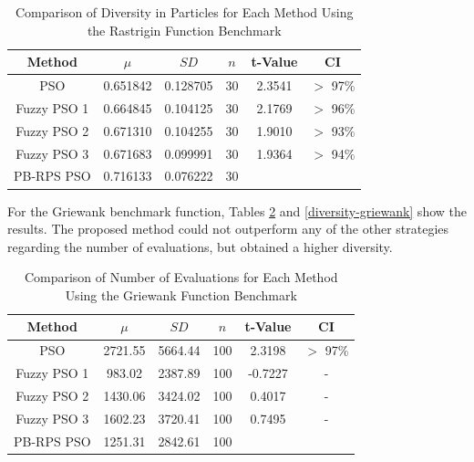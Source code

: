 \begin{table}[!t]
  \renewcommand{\arraystretch}{1.3}
  \caption{Comparison of Diversity in Particles for Each Method Using the Rastrigin Function Benchmark}
  \label{diversity-rastrigin}
  \centering
  \begin{tabular}{|c|c|c|c|c|c|}
    \hline
    Method & $\mu$ & $SD$ & $n$ & t-Value & CI \\
    \hline
    PSO 		& 0.651842 & 0.128705 & 30 & 2.3541 & $>$ 97\% \\
    \hline
    Fuzzy PSO 1 & 0.664845 & 0.104125 & 30 & 2.1769 & $>$ 96\% \\
    \hline
    Fuzzy PSO 2 & 0.671310 & 0.104255 & 30 & 1.9010 & $>$ 93\% \\
    \hline
    Fuzzy PSO 3 & 0.671683 & 0.099991 & 30 & 1.9364 & $>$ 94\% \\
    \hline
    PB-RPS PSO  & 0.716133 & 0.076222 & 30 &  &  \\
    \hline
  \end{tabular}
\end{table}

For the Griewank benchmark function, Tables \ref{evaluations-griewank} and \ref{diversity-griewank} show the results. The proposed method could not outperform any of the other strategies regarding the number of evaluations, but obtained a higher diversity.

\begin{table}[!t]
  \renewcommand{\arraystretch}{1.3}
  \caption{Comparison of Number of Evaluations for Each Method Using the Griewank Function Benchmark}
  \label{evaluations-griewank}
  \centering
  \begin{tabular}{|c|c|c|c|c|c|}
    \hline
    Method & $\mu$ & $SD$ & $n$ & t-Value & CI \\
    \hline
    PSO 		& 2721.55 & 5664.44 & 100 & 2.3198 & $>$ 97\% \\
    \hline
    Fuzzy PSO 1 & 983.02 & 2387.89 & 100 & -0.7227 & - \\
    \hline
    Fuzzy PSO 2 & 1430.06 & 3424.02 & 100 & 0.4017 & - \\
    \hline
    Fuzzy PSO 3 & 1602.23 & 3720.41 & 100 & 0.7495 & - \\
    \hline
    PB-RPS PSO  & 1251.31 & 2842.61 & 100 &  &  \\
    \hline
  \end{tabular}
\end{table}

